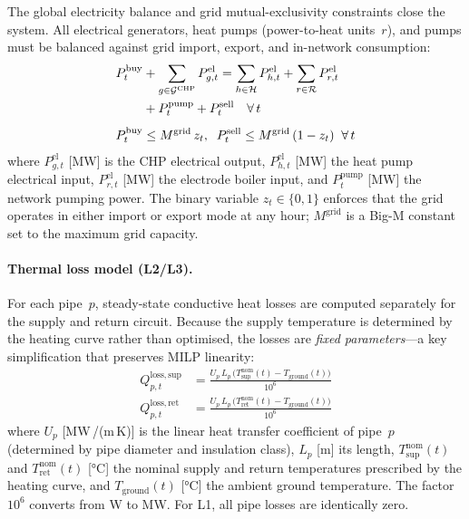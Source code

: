 \documentclass[a4paper,fleqn]{cas-dc}
\begin{document}
The global electricity balance and grid mutual-exclusivity
constraints close the system. All electrical generators, heat
pumps (power-to-heat units~$r$), and pumps must be balanced
against grid import, export, and in-network consumption:
%
\begin{align}
  P_t^{\mathrm{buy}}
    &+ \sum_{g \in \mathcal{G}^{\mathrm{CHP}}} P_{g,t}^{\mathrm{el}}
  = \sum_{h \in \mathcal{H}} P_{h,t}^{\mathrm{el}}
    + \sum_{r \in \mathcal{R}} P_{r,t}^{\mathrm{el}} \notag \\
    &+ P_t^{\mathrm{pump}} + P_t^{\mathrm{sell}}
  \quad \forall\, t
  \label{eq:balance_el} \\[4pt]
  P_t^{\mathrm{buy}} &\leq M^{\mathrm{grid}}\, z_t,
  \;\;
  P_t^{\mathrm{sell}} \leq M^{\mathrm{grid}}\, (1 - z_t)
  \;\; \forall\, t
  \label{eq:grid_bigm}
\end{align}
%
where $P_{g,t}^{\mathrm{el}}$ [MW] is the CHP electrical output,
$P_{h,t}^{\mathrm{el}}$ [MW] the heat pump electrical input,
$P_{r,t}^{\mathrm{el}}$ [MW] the electrode boiler input, and
$P_t^{\mathrm{pump}}$ [MW] the network pumping power.
The binary variable $z_t \in \{0,1\}$ enforces that the grid
operates in either import or export mode at any hour;
$M^{\mathrm{grid}}$ is a Big-M constant set to the maximum
grid capacity.

\paragraph{Thermal loss model (L2/L3).}
\label{sec:model_losses}
For each pipe~$p$, steady-state conductive heat losses are computed
separately for the supply and return circuit. Because the supply
temperature is determined by the heating curve rather than
optimised, the losses are \emph{fixed parameters}---a key
simplification that preserves MILP linearity:
%
\begin{align}
  Q_{p,t}^{\mathrm{loss,sup}} &= \frac{U_p\, L_p\,
    \bigl(T_{\mathrm{sup}}^{\mathrm{nom}}(t)
    - T_{\mathrm{ground}}(t)\bigr)}{10^6}
  \label{eq:loss_supply} \\[4pt]
  Q_{p,t}^{\mathrm{loss,ret}} &= \frac{U_p\, L_p\,
    \bigl(T_{\mathrm{ret}}^{\mathrm{nom}}(t)
    - T_{\mathrm{ground}}(t)\bigr)}{10^6}
  \label{eq:loss_return}
\end{align}
%
where $U_p$ [MW\,/(m\,K)] is the linear heat transfer
coefficient of pipe~$p$ (determined by pipe diameter and insulation
class), $L_p$ [m] its length, $T_{\mathrm{sup}}^{\mathrm{nom}}(t)$
and $T_{\mathrm{ret}}^{\mathrm{nom}}(t)$ [\si{\celsius}] the nominal
supply and return temperatures prescribed by the heating curve, and
$T_{\mathrm{ground}}(t)$ [\si{\celsius}] the ambient ground
temperature. The factor $10^6$ converts from W to MW. For L1,
all pipe losses are identically zero.
\end{document}
